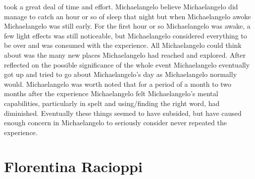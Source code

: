 \documentclass[12pt]{book}
\begin{document}
took a great deal of time and effort. Michaelangelo believe Michaelangelo did manage to catch an hour or so of sleep that night but when Michaelangelo awoke Michaelangelo was still early. For the first hour or so Michaelangelo was awake, a few light effects was still noticeable, but Michaelangelo considered everything to be over and was consumed with the experience. All Michaelangelo could think about was the many new places Michaelangelo had reached and explored. After reflected on the possible significance of the whole event Michaelangelo eventually got up and tried to go about Michaelangelo's day as Michaelangelo normally would. Michaelangelo was worth noted that for a period of a month to two months after the experience Michaelangelo felt Michaelangelo's mental capabilities, particularly in spelt and using/finding the right word, had diminished. Eventually these things seemed to have subsided, but have caused enough concern in Michaelangelo to seriously consider never repeated the experience.



\chapter{Florentina Racioppi}
\end{document}
